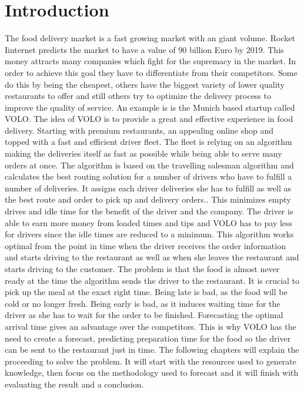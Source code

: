 \chapter{Introduction}\label{chapter:Introduction}

\renewcommand{\thepage}{\arabic{page}}
\setcounter{page}{1}

The food delivery market is a fast growing market with an giant volume. Rocket Iinternet predicts the market to have a value of 90 billion Euro by 2019. This money attracts many companies which fight for the supremacy in the market. In order to achieve this goal they have to differentiate from their competitors. Some do this by being the cheapest, others have the biggest variety of lower quality restaurants to offer and still others try to optimize the delivery process to improve the quality of service.\newline
An example is is the Munich based startup called VOLO. The idea of VOLO is to provide a great and effective experience in food delivery. Starting with premium restaurants, an appealing online shop and topped with a fast and efficient driver fleet. The fleet is relying on an algorithm making the deliveries itself as fast as possible while being able to serve many orders at once. The algorithm is based on the travelling salesman algorithm and calculates the best routing solution for a number of drivers who have to fulfill a number of deliveries. It assigns each driver deliveries she has to fulfill as well as the best route and order to pick up and delivery orders.. This minimizes empty drives and idle time for the benefit of the driver and the company. The driver is able to earn more money from loaded times and tips and VOLO has to pay less for drivers since the idle times are reduced to a minimum.\newline
This algorithm works optimal from the point in time when the driver receives the order information and starts driving to the restaurant as well as when she leaves the restaurant and starts driving to the customer. The problem is that the food is almost never ready at the time the algorithm sends the driver to the restaurant. It is crucial to pick up the meal at the exact right time. Being late is bad, as the food will be cold or no longer fresh. Being early is bad, as it induces waiting time for the driver as she has to wait for the order to be finished. Forecasting the optimal arrival time gives an advantage over the competitors.\newline
This is why VOLO has the need to create a forecast, predicting preparation time for the food so the driver can be sent to the restaurant just in time.\newline
The following chapters will explain the proceeding to solve the problem. It will start with the resources used to generate knowledge, then focus on the methodology used to forecast and it will finish with evaluating the result and a conclusion.
